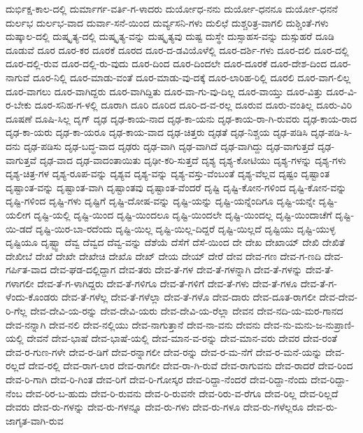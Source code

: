 ದುರ್ಭಿಕ್ಷ-ಕಾಲ-ದಲ್ಲಿ
ದುರ್ಮಾರ್ಗ-ವರ್ತಿ-ಗ-ಳಾದರು
ದುರ್ಯೋಧ-ನನು
ದುರ್ಯೋ-ಧನನೂ
ದುರ್ಯೋ-ಧನನೆ
ದುರ್ಲಭ
ದುರ್ಲಭ-ವಾದ
ದುರ್ವಾ-ಸನೆ-ಯಿಂದ
ದುರ್ವ್ಯಸನಿ-ಗಳು
ದುಲಿಛೆ
ದುಶ್ಚರಿತ್ರ-ವಾಗಲಿ
ದುಶ್ಚಿಂತೆ-ಗಳು
ದುಷ್ಕಾಲ-ದಲ್ಲಿ
ದುಷ್ಕೃತ್ಯ-ದಲ್ಲಿ
ದುಷ್ಕೃತ್ಯ-ವನ್ನು
ದುಷ್ಕೃತ್ಯವು
ದುಷ್ಟ
ದುಸ್ಥೇ
ದುಸ್ಸಾಹಸ-ವನ್ನು
ದುಸ್ಸುಹರೆ
ದೂಡಿ
ದೂಡುವೆ
ದೂರ
ದೂರ-ಕರ
ದೂರಕೆ
ದೂರದ
ದೂರ-ದ-ಡವಿಯೊಳೆಲ್ಲಿ
ದೂರ-ದರ್ಶಿ-ಗಳು
ದೂರ-ದಲಿ
ದೂರ-ದಲ್ಲಿ
ದೂರ-ದಲ್ಲಿ-ರುವ
ದೂರ-ದಲ್ಲಿ-ರು-ವುದು
ದೂರ-ದಿಂದ
ದೂರ-ದಿಂದಲೇ
ದೂರ-ದೂರಕೆ
ದೂರ-ದೇಶ-ದಿಂದ
ದೂರ-ನಾಗುವೆ
ದೂರ-ನಿಲ್ಲಿ
ದೂರ-ಮಾಡು-ವಂತೆ
ದೂರ-ಮಾಡು-ವು-ದಕ್ಕೆ
ದೂರ-ಲಾರಿಹ-ರಿಲ್ಲಿ
ದೂರಲಿ
ದೂರ-ವಾಗ-ಲಿಲ್ಲ
ದೂರ-ವಾಗಲು
ದೂರ-ವಾಗಿದ್ದರು
ದೂರ-ವಾಗಿದ್ದಿತು
ದೂರ-ವಾ-ಗು-ವು-ದಿಲ್ಲ
ದೂರ-ವಾಯ್ತು
ದೂರ-ವಿತ್ತು
ದೂರ-ವಿ-ರ-ಬೇಕು
ದೂರ-ಸನಿಹ-ಗ-ಳಲ್ಲಿ
ದೂರಾಗಿ
ದೂರಿ
ದೂರಿದ
ದೂರಿ-ದ-ವ-ರಲ್ಲ
ದೂರುವ
ದೂರು-ವಂತಿಲ್ಲ
ದೂರು-ವಿರಿ
ದೂಷಣೆ
ದೂಷಿ-ಸಿಲ್ಲ
ದೃಗ್
ದೃಢ
ದೃಢ-ಕಾಯ-ನಾದ
ದೃಢ-ಕಾ-ಯನು
ದೃಢ-ಕಾಯ-ರಾ-ಗಿ-ರುವರು
ದೃಢ-ಕಾಯ-ರಾದ
ದೃಢ-ಕಾ-ಯರು
ದೃಢ-ಕಾ-ಯರೂ
ದೃಢ-ಕಾಯ-ವಾದ
ದೃಢ-ಚಿತ್ತರು
ದೃಢತೆ
ದೃಢ-ನಿಶ್ಚಯ
ದೃಢ-ಪಡಿಸಿ
ದೃಢ-ಪಡಿ-ಸಿ-ದನು
ದೃಢ-ಪಡಿಸು
ದೃಢ-ಬದ್ಧ-ವಾದ
ದೃಢರು
ದೃಢ-ವಾಗಿ
ದೃಢ-ವಾಗಿದೆ
ದೃಢ-ವಾಗಿದ್ದು
ದೃಢ-ವಾಗುತ್ತದೆ
ದೃಢ-ವಾಗುತ್ತವೆ
ದೃಢ-ವಾದ
ದೃಢ-ವಾದಂತಾಯಿತು
ದೃಢೀ-ಕರಿ-ಸುತ್ತದೆ
ದೃಶ್ಯ
ದೃಶ್ಯ-ಕೋಟಿಯು
ದೃಶ್ಯ-ಗಳನ್ನು
ದೃಶ್ಯ-ಗಳು
ದೃಶ್ಯ-ಚಿತ್ರ-ಗಳ
ದೃಶ್ಯ-ರೂಪ-ವನ್ನು
ದೃಶ್ಯವ
ದೃಶ್ಯ-ವನ್ನು
ದೃಶ್ಯ-ವಸ್ತು-ವೆಂಬಂತೆ
ದೃಶ್ಯ-ವೆಲ್ಲವ
ದೃಷ್ಟಂ
ದೃಷ್ಟಾಂತ
ದೃಷ್ಟಾಂತ-ವನ್ನು
ದೃಷ್ಟಾಂತ-ವಾಗಿ
ದೃಷ್ಟಾಂತವು
ದೃಷ್ಟಾಂತ-ವೆಂದರೆ
ದೃಷ್ಟಿ
ದೃಷ್ಟಿ-ಕೋನ-ಗಳಿಂದ
ದೃಷ್ಟಿ-ಕೋನ-ವನ್ನು
ದೃಷ್ಟಿ-ಗಳಿಂದ
ದೃಷ್ಟಿ-ಗಳು
ದೃಷ್ಟಿಗೆ
ದೃಷ್ಟಿ-ದೋಷ-ವನ್ನು
ದೃಷ್ಟಿ-ಯನ್ನು
ದೃಷ್ಟಿ-ಯನ್ನೆಂದಿಗೂ
ದೃಷ್ಟಿ-ಯನ್ನೇ
ದೃಷ್ಟಿ-ಯಲೀಗ
ದೃಷ್ಟಿ-ಯಲ್ಲಿ
ದೃಷ್ಟಿ-ಯಿಂದ
ದೃಷ್ಟಿ-ಯಿಂದಲೂ
ದೃಷ್ಟಿ-ಯಿಂದಲೇ
ದೃಷ್ಟಿ-ಯಿಂದಲ್ಲ
ದೃಷ್ಟಿ-ಯಿಂದಾಚೆಗೆ
ದೃಷ್ಟಿ-ಯಿ-ಡದೆ
ದೃಷ್ಟಿ-ಯಿರ-ಬಾ-ರದೆಂದು
ದೃಷ್ಟಿ-ಯಿಲ್ಲ
ದೃಷ್ಟಿ-ಯಿಲ್ಲ-ದಿದ್ದರೆ
ದೃಷ್ಟಿ-ಯಿಲ್ಲದೆ
ದೃಷ್ಟಿಯು
ದೃಷ್ಟಿ-ಯುಳ್ಳ
ದೃಷ್ಟಿಯೂ
ದೃಷ್ಟ್ವಾ
ದೆವ್ವ
ದೆವ್ವದ
ದೆವ್ವ-ವನ್ನು
ದೆಶೆಯೆ
ದೆಸೆಗೆ
ದೆಸೆ-ಯಿಂದ
ದೇ
ದೇಖ
ದೇಖಾಯ್
ದೇಖಿ
ದೇಖಿತೆ
ದೇಖೀಬೆ
ದೇಖೆ
ದೇಖೇ
ದೇಖೇಚಿ
ದೇಖೊ
ದೇಖ್
ದೇಯ
ದೇಯ್
ದೇರೆ
ದೇವ
ದೇವ-ಗಣ
ದೇವ-ಗ-ಣದಿ
ದೇವ-ಗರ್ಪಿತ-ವಾದ
ದೇವ-ಘಡ-ದಲ್ಲಿದ್ದಾಗ
ದೇವ-ತರು
ದೇವ-ತೆ-ಗಳ
ದೇವ-ತೆ-ಗಳನ್ನಾಗಿ
ದೇವ-ತೆ-ಗಳನ್ನು
ದೇವ-ತೆ-ಗಳಾಗಲೀ
ದೇವ-ತೆ-ಗ-ಳಾಗಿದ್ದರು
ದೇವ-ತೆ-ಗಳಿಗೂ
ದೇವ-ತೆ-ಗಳಿಗೆ
ದೇವ-ತೆ-ಗಳು
ದೇವ-ತೆ-ಗಳೂ
ದೇವ-ತೆ-ಗ-ಳೆಂದು-ಕೊಂಡರು
ದೇವ-ತೆ-ಗಳೆಲ್ಲ
ದೇವ-ತೆ-ಗಳೆಲ್ಲಾ
ದೇವ-ತೆ-ಗಳೊ
ದೇವ-ದಾರು
ದೇವ-ದೂತ-ರಾಗಲೀ
ದೇವ-ದೇವ-ರಿ-ಗೆಲ್ಲ
ದೇವ-ದೇವಿ-ಯ-ರನ್ನು
ದೇವ-ದೇವಿ-ಯರು
ದೇವ-ದೇವಿ-ಯ-ರೆಲ್ಲಾ
ದೇವನ
ದೇವ-ನದಿ-ಯ-ಮರ-ಗಾನದ
ದೇವ-ನನ್ನಾಗಿ
ದೇವ-ನಲಿ
ದೇವ-ನಲ್ಲಿಯು
ದೇವ-ನಾಗುತ್ತಾನೆ
ದೇವ-ನಾ-ವನು
ದೇವನು
ದೇವ-ನು-ಮನು-ಜ-ನುಪ್ರಾಣಿ-ಯಲ್ಲಿ
ದೇವನೆ
ದೇವ-ಭಾಷೆ
ದೇವ-ಭಾಷೆ-ಯಲ್ಲಿ
ದೇವ-ಮಾನ-ವ-ರನ್ನು
ದೇವ-ಮಾನ-ವರು
ದೇವರ
ದೇವ-ರಂತೆ
ದೇವ-ರ-ಗುಣ-ಗಳೇ
ದೇವ-ರ-ಡಿಗೆ
ದೇವ-ರನ್ನಾಗಲೀ
ದೇವ-ರನ್ನು
ದೇವ-ರ-ಮ-ನೆಗೆ
ದೇವ-ರ-ಮನೆ-ಯನ್ನು
ದೇವ-ರಲ್ಲದೆ
ದೇವ-ರಲ್ಲಿ
ದೇವ-ರಾಗ-ಲಾರ
ದೇವ-ರಾಗಲೀ
ದೇವ-ರಾ-ಗಿ-ರುವೆ
ದೇವ-ರಾಗುವನು
ದೇವ-ರಾದರೆ
ದೇವ-ರಿಂದ
ದೇವ-ರಿ-ಗಾಗಿ
ದೇವ-ರಿ-ಗಿಂತ
ದೇವ-ರಿಗೆ
ದೇವ-ರಿ-ಗೋಸ್ಕರ
ದೇವ-ರಿದ್ದಾ-ನೆಂದರೆ
ದೇವ-ರಿದ್ದಾ-ನೆಂದು
ದೇವ-ರಿದ್ದಾ-ನೆಂಬ
ದೇವ-ರಿರ-ಬ-ಹುದು
ದೇವ-ರಿ-ರುವನು
ದೇವ-ರಿ-ರುವನೇ
ದೇವ-ರಿರು-ವ-ರೆಗೂ
ದೇವ-ರಿಲ್ಲ
ದೇವ-ರಿಲ್ಲದೆ
ದೇವರು
ದೇವ-ರು-ಗಳನ್ನು
ದೇವ-ರು-ಗಳನ್ನೂ
ದೇವ-ರು-ಗಳು
ದೇವ-ರು-ಗಳೂ
ದೇವ-ರು-ಗಳೆಲ್ಲರೂ
ದೇವ-ರು-ಜಾಗೃತ-ವಾಗಿ-ರುವ
